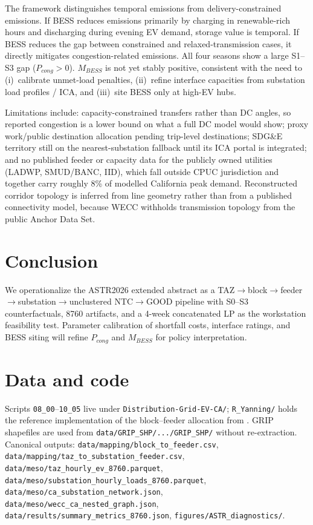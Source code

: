\documentclass[11pt]{article}
\begin{document}
The framework distinguishes temporal emissions from delivery-constrained emissions. If BESS reduces emissions primarily by charging in renewable-rich hours and discharging during evening EV demand, storage value is temporal. If BESS reduces the gap between constrained and relaxed-transmission cases, it directly mitigates congestion-related emissions. All four seasons show a large S1--S3 gap (\(P_{cong}>0\)). \(M_{BESS}\) is not yet stably positive, consistent with the need to (i)~calibrate unmet-load penalties, (ii)~refine interface capacities from substation load profiles / ICA, and (iii)~site BESS only at high-EV hubs.

Limitations include: capacity-constrained transfers rather than DC angles, so reported congestion is a lower bound on what a full DC model would show; proxy work/public destination allocation pending trip-level destinations; SDG\&E territory still on the nearest-substation fallback until its ICA portal is integrated; and no published feeder or capacity data for the publicly owned utilities (LADWP, SMUD/BANC, IID), which fall outside CPUC jurisdiction and together carry roughly 8\% of modelled California peak demand. Reconstructed corridor topology is inferred from line geometry rather than from a published connectivity model, because WECC withholds transmission topology from the public Anchor Data Set.

\section{Conclusion}

We operationalize the ASTR2026 extended abstract as a TAZ\(\to\)block\(\to\)feeder\(\to\)substation\(\to\)unclustered NTC\(\to\)GOOD pipeline with S0--S3 counterfactuals, 8760 artifacts, and a 4-week concatenated LP as the workstation feasibility test. Parameter calibration of shortfall costs, interface ratings, and BESS siting will refine \(P_{cong}\) and \(M_{BESS}\) for policy interpretation.

\section*{Data and code}

Scripts \texttt{08\_00}--\texttt{10\_05} live under \texttt{Distribution-Grid-EV-CA/}; \texttt{R\_Yanning/} holds the reference implementation of the block--feeder allocation from \citet{li_impact_2024}. GRIP shapefiles are used from
\texttt{data/GRIP\_SHP/.../GRIP\_SHP/} without re-extraction. Canonical outputs: \texttt{data/mapping/block\_to\_feeder.csv}, \texttt{data/mapping/taz\_to\_substation\_feeder.csv}, \texttt{data/meso/taz\_hourly\_ev\_8760.parquet}, \texttt{data/meso/substation\_hourly\_loads\_8760.parquet}, \texttt{data/meso/ca\_substation\_network.json}, \texttt{data/meso/wecc\_ca\_nested\_graph.json}, \texttt{data/results/summary\_metrics\_8760.json}, \texttt{figures/ASTR\_diagnostics/}.

\newpage


\end{document}
